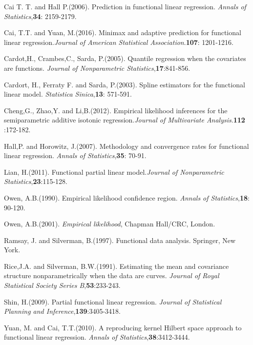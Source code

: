 \documentclass[preprint,12pt]{elsarticle}
\begin{document}
	
	\begin{thebibliography}{9}
		
	Cai T. T. and Hall P.(2006). Prediction in functional linear regression. \textit{Annals of Statistics},{\bf 34}: 2159-2179.
	
	 Cai, T.T. and Yuan, M.(2016). Minimax and adaptive prediction for functional linear regression.\textit{Journal of American Statistical Association}.{\bf 107}: 1201-1216.
	
	Cardot,H., Crambes,C., Sarda, P.(2005). Quantile regression when the covariates are functions. \textit{Journal of Nonparametric Statistics},{\bf17}:841-856.
	
	Cardort, H., Ferraty F. and Sarda, P.(2003). Spline estimators for the functional linear model. \textit{Statistica Sinica},{\bf 13}: 571-591.
	
	Cheng,G., Zhao,Y. and Li,B.(2012). Empirical likelihood inferences for the semiparametric additive isotonic regression.\textit{Journal of Multivariate Analysis}.{\bf112 }:172-182.
	
	Hall,P. and Horowitz, J.(2007). Methodology and convergence rates for functional linear regression. \textit{Annals of Statistics},{\bf 35}: 70-91.

	Lian, H.(2011). Functional partial linear model.\textit{Journal of Nonparametric Statistics},{\bf 23}:115-128.
	
	Owen, A.B.(1990). Empirical likelihood confidence region. \textit{Annals of Statistics},{\bf 18}: 90-120.
	
	Owen, A.B.(2001). \textit{Empirical likelihood}, Chapman Hall/CRC, London.
	
	
	Ramsay, J. and Silverman, B.(1997). Functional data analysis. Springer, New York.
	
	Rice,J.A. and Silverman, B.W.(1991). Estimating the mean and covariance structure nonparametrically when the  data are curves. \textit{Journal of Royal Statistical Society Series B},{\bf 53}:233-243.
	
	Shin, H.(2009). Partial functional linear regression. \textit{Journal of Statistical Planning and Inference},{\bf139}:3405-3418.
	
	Yuan, M. and Cai, T.T.(2010). A reproducing kernel Hilbert space approach to functional linear regression. \textit{Annals of Statistics},{\bf38}:3412-3444.
	

\end{thebibliography}
\end{document}
